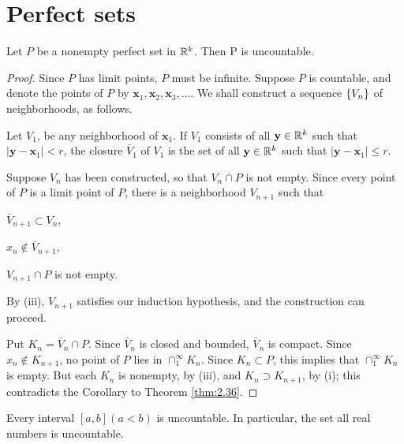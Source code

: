 \section{Perfect sets}

\begin{thm}\label{thm:2.43}
    Let $P$ be a nonempty perfect set in ${\protect\mathbb R}^k$. Then P is uncountable.    
\end{thm}
\begin{proof}
    Since $P$ has limit points, $P$ must be infinite. 
    Suppose $P$ is countable, and denote the points of $P$ by $\mathbf{x}_{1}, \mathbf{x}_{2}, \mathbf{x}_{3},\dots$. 
    We shall construct a sequence $\protect\{V_n\}$ of neighborhoods, as follows.
    
    Let $V_{1}$, be any neighborhood of $\mathbf{x}_1$. 
    If $V_{1}$ consists of all $\mathbf{y} \in {\protect\mathbb R}^k$ 
    such that $\left| \mathbf{y} - \mathbf{x}_1 \right| < r$, 
    the closure $\bar{V}_{1}$ of $V_1$ is the set of all $\mathbf{y} \in {\protect\mathbb R}^k$ 
    such that $\left| \mathbf{y} - \mathbf{x}_1 \right| \leq r$.

    Suppose $V_n$ has been constructed, 
    so that $V_n \cap P$ is not empty. 
    Since every point of $P$ is a limit point of $P$, 
    there is a neighborhood $V_{n+1}$ such that 
    \begin{inparaenum}[(i)]
        \item $\bar{V}_{n+1} \subset V_n$,
        \item $x_n \not\in \bar{V}_{n+1}$,
        \item $V_{n+1} \cap P$ is not empty. 
    \end{inparaenum}
    By (iii), $V_{n+1}$ satisfies our induction hypothesis, 
    and the construction can proceed.
    
    Put $K_n = \bar{V}_n \cap P$. 
    Since $\bar{V}_n$ is closed and bounded, 
    $\bar{V}_n$ is compact.
    Since $x_n \not\in K_{n+1}$, 
    no point of $P$ lies in $\cap_1^{\infty} K_n$.
    Since $K_n \subset P$, 
    this implies that $\cap_1^{\infty} K_n$ is empty. 
    But each $K_n$ is nonempty, 
    by (iii), and $K_n \supset K_{n+1}$,
    by (i); this contradicts the Corollary to Theorem \ref{thm:2.36}.
\end{proof}

\begin{myCorollary}
	Every interval $[a, b] (a <b)$ is uncountable. In particular, the set
	all real numbers is uncountable.
\end{myCorollary}



